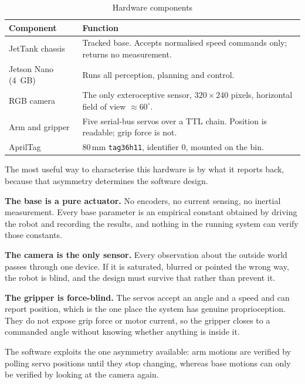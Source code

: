 \documentclass[conference,a4paper,10pt]{IEEEtran}
\begin{document}
\begin{table}[t]
\caption{Hardware components}
\label{tab:hardware}
\centering
\footnotesize
\begin{tabularx}{\columnwidth}{@{}lX@{}}
\toprule
\textbf{Component} & \textbf{Function} \\
\midrule
JetTank chassis & Tracked base. Accepts normalised speed commands only;
returns no measurement. \\
Jetson Nano (4~GB) & Runs all perception, planning and control. \\
RGB camera & The only exteroceptive sensor, $320\times240$ pixels,
horizontal field of view $\approx 60^{\circ}$. \\
Arm and gripper & Five serial-bus servos over a TTL chain. Position is
readable; grip force is not. \\
AprilTag & 80\,mm \texttt{tag36h11}, identifier 0, mounted on the bin. \\
\bottomrule
\end{tabularx}
\end{table}

The most useful way to characterise this hardware is by what it reports
back, because that asymmetry determines the software design.

\textbf{The base is a pure actuator.} No encoders, no current sensing, no
inertial measurement. Every base parameter is an empirical constant
obtained by driving the robot and recording the results, and nothing in
the running system can verify those constants.

\textbf{The camera is the only sensor.} Every observation about the
outside world passes through one device. If it is saturated, blurred or
pointed the wrong way, the robot is blind, and the design must survive
that rather than prevent it.

\textbf{The gripper is force-blind.} The servos accept an angle and a
speed and can report position, which is the one place the system has
genuine proprioception. They do not expose grip force or motor current,
so the gripper closes to a commanded angle without knowing whether
anything is inside it.

The software exploits the one asymmetry available: arm motions are
verified by polling servo positions until they stop changing, whereas
base motions can only be verified by looking at the camera again.
\end{document}
